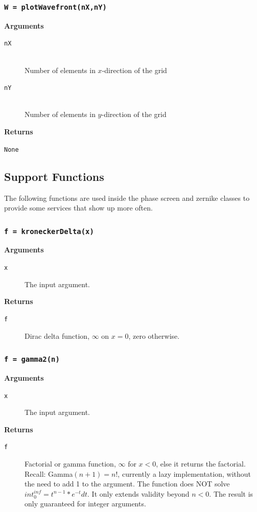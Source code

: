 \documentclass{article}
\begin{document}
\newpage
\subsubsection*{\texttt{W = plotWavefront(nX,nY)}}
\textbf{Arguments}
\begin{description}
  \item[\texttt{nX}] \hfill \\
  Number of elements in $x$-direction of the grid
  \item[\texttt{nY}] \hfill \\
 	Number of elements in $y$-direction of the grid
\end{description}
\textbf{Returns}
\begin{description}
	\item[\texttt{None}]
\end{description}

\newpage
\subsection{Support Functions}
The following functions are used inside the phase screen and zernike classes to provide some services that show up more often.

\subsubsection*{\texttt{f = kroneckerDelta(x)}}
\textbf{Arguments}
\begin{description}
	\item[\texttt{x}]
	The input argument.
\end{description}
\textbf{Returns}
\begin{description}
	\item[\texttt{f}]
	Dirac delta function, $\infty$ on $x=0$, zero otherwise.
\end{description}

\newpage
\subsubsection*{\texttt{f = gamma2(n)}}
\textbf{Arguments}
\begin{description}
	\item[\texttt{x}]
	The input argument.
\end{description}
\textbf{Returns}
\begin{description}
	\item[\texttt{f}]
	Factorial or gamma function, $\infty$ for $x<0$, else it returns the factorial. Recall: Gamma$(n+1) = n!$, currently a lazy implementation, without the need to add 1 to the argument. The function does NOT solve $int_{0}^{inf} = t^{n-1}*e^{-t} dt$. It only extends validity beyond $n < 0$. The result is only guaranteed for integer arguments.
\end{description}
\end{document}
